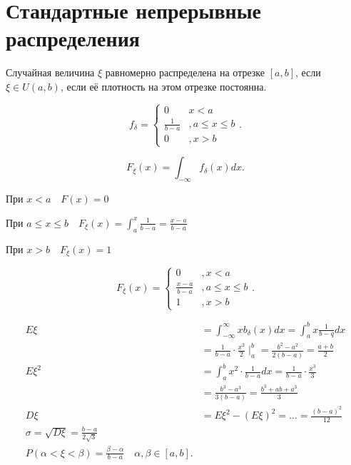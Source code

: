 \section{Стандартные непрерывные распределения}

\begin{definition}
    Случайная величина $\xi$ равномерно распределена на отрезке $[a,b]$, если $\xi\in U(a,b)$, если её плотность на этом отрезке постоянна.

    \[
    f_\delta = \begin{cases}
        0&x<a\\ \frac{1}{b-a}&, a\leqslant x\leqslant b\\ 0&,x>b
    \end{cases}
    .\] 
\end{definition}

\begin{note}
   \[
       F_\xi(x) = \int_{-\infty } f_\delta(x)dx
   .\]

   При $x<a\quad F(x) = 0$

   При  $a\leqslant x\leqslant b\quad F_\xi(x) = \int_a^x \frac{1}{b-a} = \frac{x-a}{b-a}$ 

   При $x>b\quad F_\xi(x) = 1$

    \[
        F_\xi(x) = \begin{cases}
            0&,x<a\\ \frac{x-a}{b-a}&, a \leqslant x\leqslant b\\ 1&, x>b
        \end{cases}
   .\] 

   \begin{align*}
       E\xi &= \int_{-\infty }^{\infty}xb_{\delta}(x)dx = \int_a^b x \frac{1}{b-q}dx\\
            &=  \frac{1}{b-a}\cdot \frac{x^2}{2} \mid_a^b = \frac{b^2-a^2}{2(b-a)} = \frac{a+b}{2}\\
         E\xi^2 &= \int_a^b x^2 \cdot \frac{1}{b-a}dx = \frac{1}{b-a}\cdot \frac{x^3}{3} \\
                &= \frac{b^3 - a^3}{3(b-a)} = \frac{b^3+ab+a^3}{3} \\
         D\xi &= E\xi^2 - \left( E\xi \right) ^2 = \ldots = \frac{(b-a)^2}{12}\\
         \sigma = \sqrt{D\xi} = \frac{b-a}{2\sqrt{3} }\\
         P\left( \alpha <\xi<\beta \right)  = \frac{\beta - \alpha}{b-a}\quad \alpha, \beta\in[a,b]
   .\end{align*}
\end{note}

